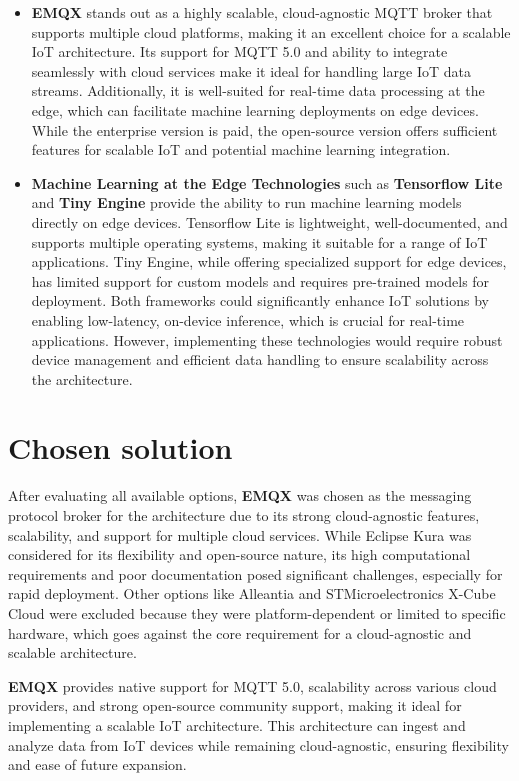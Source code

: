 \begin{itemize}
    \item \textbf{EMQX} stands out as a highly scalable, cloud-agnostic MQTT broker that supports multiple cloud platforms, making it an excellent choice for a scalable IoT architecture. Its support for MQTT 5.0 and ability to integrate seamlessly with cloud services make it ideal for handling large IoT data streams. Additionally, it is well-suited for real-time data processing at the edge, which can facilitate machine learning deployments on edge devices. While the enterprise version is paid, the open-source version offers sufficient features for scalable IoT and potential machine learning integration.

    \item \textbf{Machine Learning at the Edge Technologies} such as \textbf{Tensorflow Lite} and \textbf{Tiny Engine} provide the ability to run machine learning models directly on edge devices. Tensorflow Lite is lightweight, well-documented, and supports multiple operating systems, making it suitable for a range of IoT applications. Tiny Engine, while offering specialized support for edge devices, has limited support for custom models and requires pre-trained models for deployment. Both frameworks could significantly enhance IoT solutions by enabling low-latency, on-device inference, which is crucial for real-time applications. However, implementing these technologies would require robust device management and efficient data handling to ensure scalability across the architecture.
\end{itemize}

\section{Chosen solution}
\label{sec:chosen-solution}
After evaluating all available options, \textbf{EMQX} was chosen as the messaging protocol broker for the architecture due to its strong cloud-agnostic features, scalability, and support for multiple cloud services. While Eclipse Kura was considered for its flexibility and open-source nature, its high computational requirements and poor documentation posed significant challenges, especially for rapid deployment. Other options like Alleantia and STMicroelectronics X-Cube Cloud were excluded because they were platform-dependent or limited to specific hardware, which goes against the core requirement for a cloud-agnostic and scalable architecture.

\textbf{EMQX} provides native support for MQTT 5.0, scalability across various cloud providers, and strong open-source community support, making it ideal for implementing a scalable IoT architecture. This architecture can ingest and analyze data from IoT devices while remaining cloud-agnostic, ensuring flexibility and ease of future expansion.

